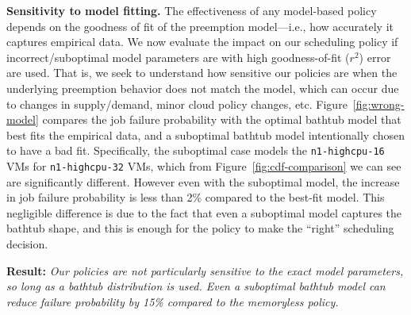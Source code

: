 


\noindent \textbf{Sensitivity to model fitting.}
The effectiveness of any model-based policy depends on the goodness of fit of the preemption model---i.e., how accurately it captures empirical data. 
%
We now evaluate the impact on our scheduling policy if incorrect/suboptimal model parameters are with high goodness-of-fit ($r^2$) error are used. 
%
That is, we seek to understand how sensitive our policies are when the underlying preemption behavior does not match the model, which can occur due to changes in supply/demand, minor cloud policy changes, etc. 
%
Figure~\ref{fig:wrong-model} compares the job failure probability with the optimal bathtub model that best fits the empirical data, and a suboptimal  bathtub model intentionally chosen to have a bad fit. 
%
Specifically, the suboptimal case models the \texttt{n1-highcpu-16} VMs for \texttt{n1-highcpu-32} VMs, which from Figure~\ref{fig:cdf-comparison} we can see are significantly different.
%
However even with the suboptimal model, the increase in job failure probability is less than 2\% compared to the best-fit model. 
%
This negligible difference is due to the fact that even a suboptimal model captures the bathtub shape, and this is enough for the policy to make the ``right'' scheduling decision. 

\noindent \textbf{Result:} \emph{Our policies are not particularly sensitive to the exact model parameters, so long as a bathtub distribution is used. Even a suboptimal bathtub model can reduce failure probability by 15\% compared to the memoryless policy.} 
%


